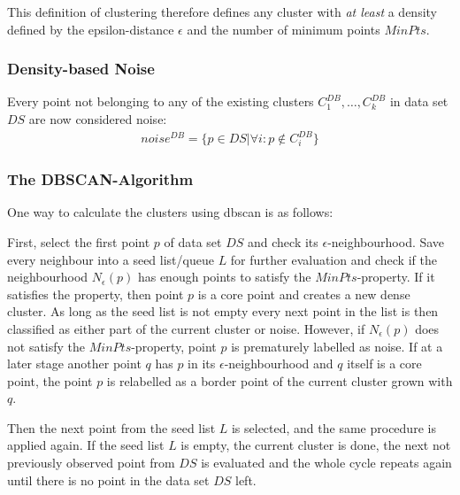 This definition of clustering therefore defines any cluster with \textit{at least} a density defined by the epsilon-distance $\epsilon$ and the number of minimum points $MinPts$.

\subsubsection*{Density-based Noise}
Every point not belonging to any of the existing clusters $C^{DB}_1, \dotsc, C^{DB}_k$ in data set $DS$ are now considered noise: 
\begin{align}
    noise^{DB} = \{p \in  DS | \forall i : p \notin C^{DB}_i\}
\end{align}

\subsubsection*{The DBSCAN-Algorithm}
One way to calculate the clusters using \gls{dbscan} is as follows:

First, select the first point $p$ of data set $DS$ and check its $\epsilon$-neighbourhood. Save every neighbour into a seed list/queue $L$ for further evaluation and check if the neighbourhood $N_{\epsilon}(p)$ has enough points to satisfy the $MinPts$-property. 
If it satisfies the property, then point $p$ is a core point and creates a new dense cluster. As long as the seed list is not empty every next point in the list is then classified as either part of the current cluster or noise.
However, if $N_{\epsilon}(p)$ does not satisfy the $MinPts$-property, point $p$ is prematurely labelled as noise. If at a later stage another point $q$ has $p$ in its $\epsilon$-neighbourhood and $q$ itself is a core point, the point $p$ is relabelled as a border point of the current cluster grown with $q$.

Then the next point from the seed list $L$ is selected, and the same procedure is applied again.
If the seed list $L$ is empty, the current cluster is done, the next not previously observed point from $DS$ is evaluated and the whole cycle repeats again until there is no point in the data set $DS$ left.

